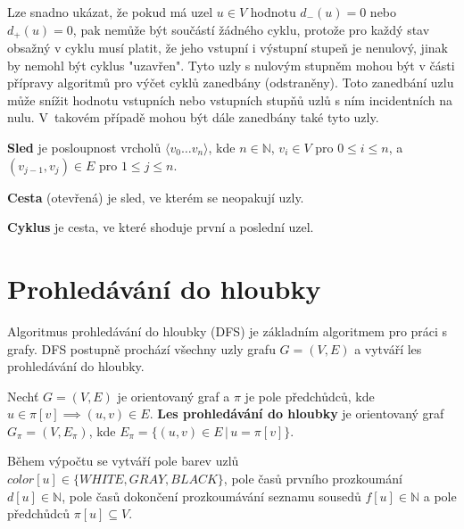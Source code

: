         \vspace*{1em}
        Lze snadno ukázat, že pokud má uzel $u \in V$ hodnotu $d_-(u) = 0$ nebo $d_+(u) = 0$, pak nemůže být součástí žádného cyklu, protože pro každý stav obsažný v cyklu musí platit, že jeho vstupní i výstupní stupeň je nenulový, jinak by nemohl být cyklus "uzavřen". Tyto uzly s nulovým stupněm mohou být v části přípravy algoritmů pro výčet cyklů zanedbány (odstraněny). Toto zanedbání uzlu může snížit hodnotu vstupních nebo vstupních stupňů uzlů s ním incidentních na nulu. V~takovém případě mohou být dále zanedbány také tyto uzly.

        \begin{definition}
            \textbf{Sled} je posloupnost vrcholů $\langle v_0 \dots v_n\rangle$, kde $n \in \mathbb{N}$, $v_i \in V$ pro $0 \leq i \leq n$, a $(v_{j-1}, v_j) \in E$ pro $1 \leq j \leq n$.
        \end{definition}

        \begin{definition}
            \textbf{Cesta} (otevřená) je sled, ve kterém se neopakují uzly.
        \end{definition}

        \begin{definition}
            \textbf{Cyklus} je cesta, ve které shoduje první a poslední uzel.
        \end{definition}

    \section{Prohledávání do hloubky}
        Algoritmus prohledávání do hloubky (DFS) je základním algoritmem pro práci s grafy. DFS postupně prochází všechny uzly grafu $G = (V, E)$ a vytváří les prohledávání do hloubky.

        \begin{definition}
            Nechť $G = (V, E)$ je orientovaný graf a $\pi$ je pole předchůdců, kde $u \in \pi[v] \implies (u, v) \in E$. \textbf{Les prohledávání do hloubky} je orientovaný graf $G_\pi = (V, E_\pi)$, kde $E_\pi = \{(u, v) \in E\,|\, u = \pi[v]\}$.
        \end{definition}

        \vspace*{1em}
        Během výpočtu se vytváří pole barev uzlů $color[u] \in \{WHITE, GRAY, BLACK\}$, pole časů prvního prozkoumání $d[u] \in \mathbb{N}$, pole časů dokončení prozkoumávání seznamu sousedů $f[u] \in \mathbb{N}$ a pole předchůdců $\pi[u] \subseteq V$.

